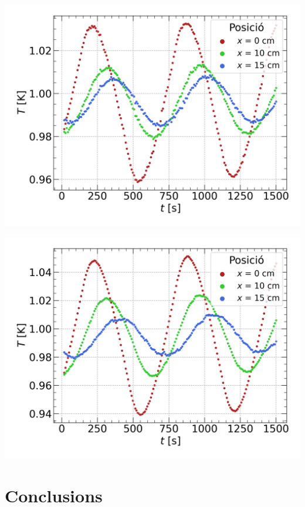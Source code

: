 \documentclass[12pt,twosides,onecolumn,openany]{article}
\newenvironment{Figura}
  {\par\medskip\noindent\minipage{\linewidth}}
  {\endminipage\par\medskip}
\begin{document}
\begin{multicols}{2}
\begin{Figura}
  \centering
  \includegraphics[width=1\linewidth]{../../graphs/practica_Ia/plots/gran_norm.png}
  \label{fig:T_vs_t_gran_norm}
\end{Figura}
\begin{Figura}
  \centering
  \includegraphics[width=1\linewidth]{../../graphs/practica_Ia/plots/petit_norm.png}
  \label{fig:T_vs_t_petita_norm}
\end{Figura}
\section{Conclusions}
\end{multicols}
\end{document}
